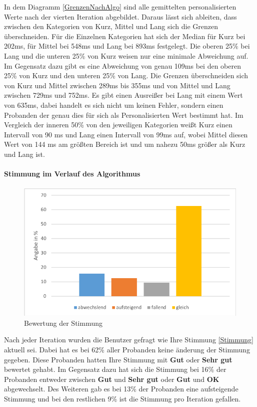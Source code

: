 In dem Diagramm \autoref{GrenzenNachAlgo} sind alle gemittelten personalisierten Werte nach der vierten Iteration abgebildet. 
Daraus l{\"a}sst sich ableiten, dass zwischen den Kategorien von Kurz, Mittel und Lang sich die Grenzen {\"u}berschneiden.
F{\"u}r die Einzelnen Kategorien hat sich der Median f{\"u}r Kurz bei 202ms, f{\"u}r Mittel bei 548ms und Lang bei 893ms festgelegt.
Die oberen 25\% bei Lang und die unteren 25\% von Kurz weisen nur eine minimale Abweichung auf. 
Im Gegensatz dazu gibt es eine Abweichung von genau 109ms bei den oberen 25\% von Kurz und den unteren 25\% von Lang.
Die Grenzen {\"u}berschneiden sich von Kurz und Mittel zwischen 289ms bis 355ms und von Mittel und Lang zwischen 729ms und 752ms.
Es gibt einen Ausrei{\ss}er bei Lang mit einem Wert von 635ms, dabei handelt es sich nicht um keinen Fehler, sondern einen Probanden der genau dies f{\"u}r sich als Personalisierten Wert bestimmt hat.
Im Vergleich der inneren 50\% von den jeweiligen Kategorien wei{\ss}t Kurz einen Intervall von 90 ms und Lang einen Intervall von 99ms auf, wobei Mittel diesen Wert von 144 ms am gr{\"o}{\ss}ten Bereich ist und um nahezu 50ms gr{\"o}{\ss}er als Kurz und Lang ist. 


\paragraph{Stimmung im Verlauf des Algorithmus}

\begin{figure}[htbp] 
            \centering
   	\includegraphics[width=\textwidth]{pics/analyse/person/Stimmung.png}
	\caption{Bewertung der Stimmung}
	\label{fig:Stimmung}
\end{figure}

Nach jeder Iteration wurden die Benutzer gefragt wie Ihre Stimmung \autoref{Stimmung} aktuell sei. Dabei hat es bei 62\% aller Probanden keine {\"a}nderung der Stimmung  gegeben. Diese Probanden hatten Ihre Stimmung mit \textbf{Gut} oder \textbf{Sehr gut} bewertet gehabt. Im Gegensatz dazu hat sich die Stimmung bei 16\% der Probanden entweder zwischen \textbf{Gut} und \textbf{Sehr gut} oder \textbf{Gut} und \textbf{OK} abgewechselt. Des Weiteren gab es bei 13\% der Probanden eine aufsteigende Stimmung und bei den restlichen 9\% ist die Stimmung pro Iteration gefallen.

